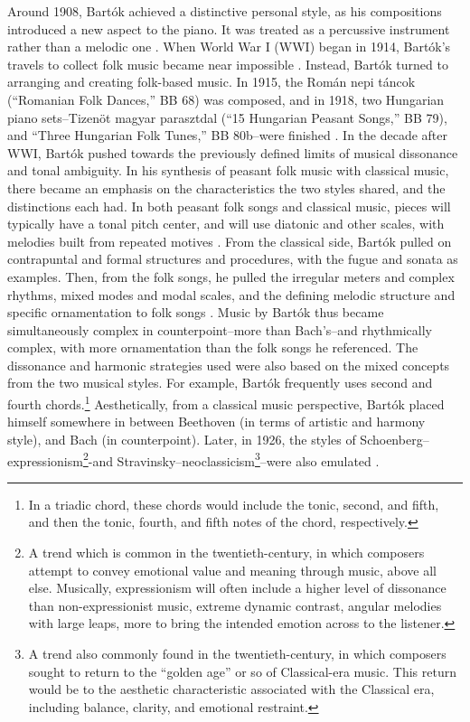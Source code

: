 Around 1908, Bartók achieved a distinctive personal style, as his compositions introduced a new aspect to the piano. It was treated as a percussive instrument rather than a melodic one \autocite{Burkholder_Grout_Palisca_2014}. When World War I (WWI) began in 1914, Bartók's travels to collect folk music became near impossible \autocite{Gillies}. Instead, Bartók turned to arranging and creating folk-based music. In 1915, the Román nepi táncok (``Romanian Folk Dances,'' BB 68) was composed, and in 1918, two Hungarian piano sets--Tizenöt magyar parasztdal (``15 Hungarian Peasant Songs,'' BB 79), and ``Three Hungarian Folk Tunes,'' BB 80b--were finished \autocite{Gillies}. In the decade after WWI, Bartók pushed towards the previously defined limits of musical dissonance and tonal ambiguity. In his synthesis of peasant folk music with classical music, there became an emphasis on the characteristics the two styles shared, and the distinctions each had. In both peasant folk songs and classical music, pieces will typically have a tonal pitch center, and will use diatonic and other scales, with melodies built from repeated motives \autocite{Burkholder_Grout_Palisca_2014}. From the classical side, Bartók pulled on contrapuntal and formal structures and procedures, with the fugue and sonata as examples. Then, from the folk songs, he pulled the irregular meters and complex rhythms, mixed modes and modal scales, and the defining melodic structure and specific ornamentation to folk songs \autocite{Burkholder_Grout_Palisca_2014}. Music by Bartók thus became simultaneously complex in counterpoint--more than Bach's--and rhythmically complex, with more ornamentation than the folk songs he referenced. The dissonance and harmonic strategies used were also based on the mixed concepts from the two musical styles. For example, Bartók frequently uses second and fourth chords.\footnote{In a triadic chord, these chords would include the tonic, second, and fifth, and then the tonic, fourth, and fifth notes of the chord, respectively.} Aesthetically, from a classical music perspective, Bartók placed himself somewhere in between Beethoven (in terms of artistic and harmony style), and Bach (in counterpoint). Later, in 1926, the styles of Schoenberg--expressionism\footnote{A trend which is common in the twentieth-century, in which composers attempt to convey emotional value and meaning through music, above all else. Musically, expressionism will often include a higher level of dissonance than non-expressionist music, extreme dynamic contrast, angular melodies with large leaps, more to bring the intended emotion across to the listener.}-and Stravinsky--neoclassicism\footnote{A trend also commonly found in the twentieth-century, in which composers sought to return to the ``golden age'' or so of Classical-era music. This return would be to the aesthetic characteristic associated with the Classical era, including balance, clarity, and emotional restraint.}--were also emulated \autocite{Gillies}.

